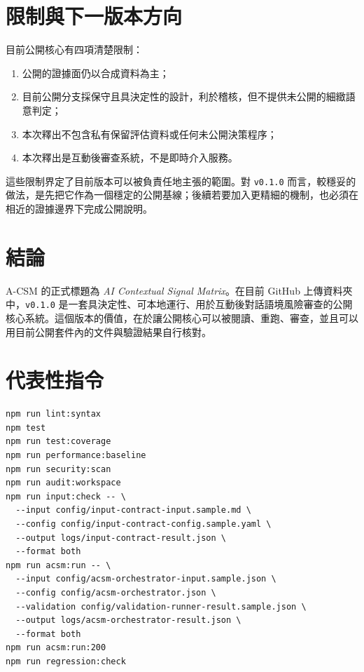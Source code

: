 \documentclass[11pt,a4paper]{article}
\begin{document}
\section{限制與下一版本方向}

目前公開核心有四項清楚限制：

\begin{enumerate}[leftmargin=1.8em]
\item 公開的證據面仍以合成資料為主；
\item 目前公開分支採保守且具決定性的設計，利於稽核，但不提供未公開的細緻語意判定；
\item 本次釋出不包含私有保留評估資料或任何未公開決策程序；
\item 本次釋出是互動後審查系統，不是即時介入服務。
\end{enumerate}

這些限制界定了目前版本可以被負責任地主張的範圍。對 \texttt{v0.1.0} 而言，較穩妥的做法，是先把它作為一個穩定的公開基線；後續若要加入更精細的機制，也必須在相近的證據邊界下完成公開說明。

\section{結論}

A-CSM 的正式標題為 \textit{AI Contextual Signal Matrix}。在目前 GitHub 上傳資料夾中，\texttt{v0.1.0} 是一套具決定性、可本地運行、用於互動後對話語境風險審查的公開核心系統。這個版本的價值，在於讓公開核心可以被閱讀、重跑、審查，並且可以用目前公開套件內的文件與驗證結果自行核對。

\appendix

\section{代表性指令}

\begin{verbatim}
npm run lint:syntax
npm test
npm run test:coverage
npm run performance:baseline
npm run security:scan
npm run audit:workspace
npm run input:check -- \
  --input config/input-contract-input.sample.md \
  --config config/input-contract-config.sample.yaml \
  --output logs/input-contract-result.json \
  --format both
npm run acsm:run -- \
  --input config/acsm-orchestrator-input.sample.json \
  --config config/acsm-orchestrator.json \
  --validation config/validation-runner-result.sample.json \
  --output logs/acsm-orchestrator-result.json \
  --format both
npm run acsm:run:200
npm run regression:check
\end{verbatim}
\end{document}
